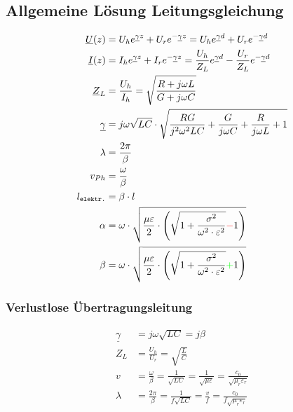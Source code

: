 \subsection{Allgemeine Lösung Leitungsgleichung}
\begin{align*}
    \underline{U}(z)   & = U_h e^{\underline{\gamma} z} + U_r e^{-\underline{\gamma} z} = U_h e^{\underline{\gamma} d} + U_r e^{-\underline{\gamma} d}                       \\
    \underline{I}(z)   & = I_h e^{\underline{\gamma} z} + I_r e^{-\underline{\gamma} z} = \frac{U_h}{Z_L}e^{\underline{\gamma} d} - \frac{U_r}{Z_L}e^{-\underline{\gamma} d} \\
    \underline{Z}_L    & = \frac{U_h}{I_h} = \sqrt{ \frac{R + j \omega L}{G + j \omega C}}                                                                                   \\
    \underline{\gamma} & = j \omega \sqrt{LC} \cdot \sqrt{ \frac{RG}{j^2 \omega^2 LC} + \frac{G}{j \omega C} + \frac{R}{j \omega L} + 1}                                     \\
    \lambda            & = \frac{2 \pi}{\beta}                                                                                                                               \\
    v_{Ph}             & = \frac{\omega}{\beta}                                                                                                                              \\
    l_\texttt{elektr.} & = \beta \cdot l                                                                                                                                     \\
    \alpha             & = \omega \cdot \sqrt{\dfrac{\mu \varepsilon}{2}\cdot \left(\sqrt{1+\dfrac{\sigma^2}{\omega^2\cdot\varepsilon^2}}{\color{red}{-}}1\right)}           \\
    \beta              & = \omega \cdot \sqrt{\dfrac{\mu \varepsilon}{2}\cdot \left(\sqrt{1+\dfrac{\sigma^2}{\omega^2\cdot\varepsilon^2}}{\color{green}{+}}1\right)}
\end{align*}

\subsubsection{Verlustlose Übertragungsleitung}
\begin{align*}
    \underline{\gamma} & = j\omega\sqrt{LC}= j\beta                                                                                           \\
    Z_L                & =\frac{U_h}{U_r}       = \sqrt{\frac{L}{C}}                                                                          \\
    v                  & = \frac{\omega}{\beta} = \frac{1}{\sqrt{LC}}= \frac{1}{\sqrt{\mu\varepsilon}}= \frac{c_0}{\sqrt{\mu_r\varepsilon_r}} \\
    \lambda            & = \frac{2\pi}{\beta}=\frac{1}{f\sqrt{LC}}= \frac{v}{f}= \frac{c_0}{f\sqrt{\mu_r\varepsilon_r}}
\end{align*}

